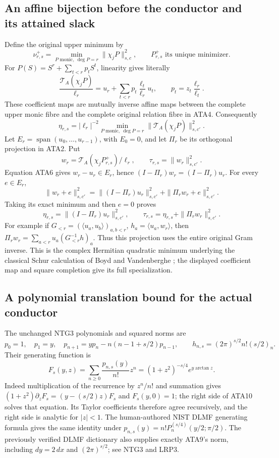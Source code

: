 \subsection{An affine bijection before the conductor and its attained slack}
Define the original upper minimum by
\[
 \nu^+_{r,s}=\min_{P\text{ monic},\ \deg P=r}
                      \|\chi_jP\|_{s,c}^2,
 \qquad P^+_{r,s}\text{ its unique minimizer}.           \tag{ATA5}
\]
For $P(S)=S^r+\sum_{t<r}p_tS^t$, linearity gives literally
\[
 \frac{\mathcal T_A(\chi_jP)}{\ell_r}
       =u_r+\sum_{t<r}p_t\frac{\ell_t}{\ell_r}u_t,
 \qquad p_t=z_t\frac{\ell_r}{\ell_t}.                  \tag{ATA6}
\]
These coefficient maps are mutually inverse affine maps between
the complete upper monic fibre and the complete original relation
fibre in ATA4.  Consequently
\[
 \eta_{r,s}=|\ell_r|^{-2}
       \min_{P\text{ monic},\ \deg P=r}
                         \|\mathcal T_A(\chi_jP)\|_{s,c'}^2.
                                                               \tag{ATA7}
\]
Let $E_r=\operatorname{span}(u_0,\ldots,u_{r-1})$, with $E_0=0$,
and let $\Pi_r$ be its orthogonal projection in ATA2.  Put
\[
 w_r=\mathcal T_A(\chi_jP^+_{r,s})/\ell_r,
 \qquad \tau_{r,s}=\|w_r\|_{s,c'}^2.
\]
Equation ATA6 gives $w_r-u_r\in E_r$, hence
$(I-\Pi_r)w_r=(I-\Pi_r)u_r$.  For every $e\in E_r$,
\[
 \|w_r+e\|_{s,c'}^2
 =\|(I-\Pi_r)u_r\|_{s,c'}^2+\|\Pi_rw_r+e\|_{s,c'}^2.
\]
Taking its exact minimum and then $e=0$ proves
\[
 \eta_{r,s}=\|(I-\Pi_r)u_r\|_{s,c'}^2,
 \qquad \tau_{r,s}=\eta_{r,s}+\|\Pi_rw_r\|_{s,c'}^2.    \tag{ATA8}
\]
For example if $G_{<r}=(\langle u_a,u_b\rangle)_{a,b<r}$,
$h_a=\langle u_a,w_r\rangle$, then
$\Pi_rw_r=\sum_{a<r}u_a(G_{<r}^{-1}h)_a$.
Thus this projection uses the entire original Gram inverse.
This is the complex Hermitian quadratic minimum underlying the
classical Schur calculation of Boyd and Vandenberghe
\cite[Appendix A.5.5, p.~650]{human:boyd-vandenberghe}; the displayed
coefficient map and square completion give its full specialization.

\subsection{A polynomial translation bound for the actual conductor}
The unchanged NTG3 polynomials and squared norms are
\[
 p_0=1,\quad p_1=y,\quad
 p_{n+1}=yp_n-n(n-1+s/2)p_{n-1},\qquad
 h_{n,s}=(2\pi)^{s/2}n!(s/2)_n.                          \tag{ATA9}
\]
Their generating function is
\[
 F_s(y,z)=\sum_{n\ge0}\frac{p_{n,s}(y)}{n!}z^n
       =(1+z^2)^{-s/4}e^{y\arctan z}.                  \tag{ATA10}
\]
Indeed multiplication of the recurrence by $z^n/n!$ and summation
gives $(1+z^2)\partial_zF_s=(y-(s/2)z)F_s$ and $F_s(y,0)=1$;
the right side of ATA10 solves that equation.  Its Taylor coefficients
therefore agree recursively, and the right side is analytic for
$|z|<1$.  The human-authored NIST DLMF generating formula
\cite[eq.~(18.23.7)]{human:dlmf18} gives the same identity under
$p_{n,s}(y)=n!P_n^{(s/4)}(y/2;\pi/2)$.  The previously verified
DLMF dictionary also supplies exactly ATA9's norm, including
$dy=2\,dx$ and $(2\pi)^{s/2}$; see NTG3 and LRP3.

